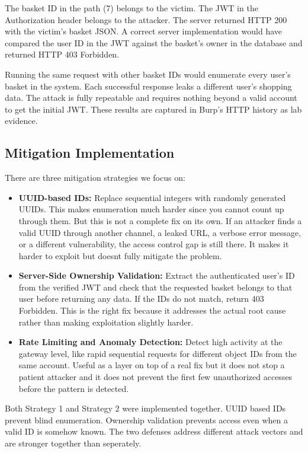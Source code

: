 \documentclass[12pt]{IEEEtran}
\begin{document}
The basket ID in the path (7) belongs to the victim. The JWT in the Authorization header belongs to the attacker. The server returned HTTP 200 with the victim's basket JSON. A correct server implementation would have compared the user ID in the JWT against the basket's owner in the database and returned HTTP 403 Forbidden.

Running the same request with other basket IDs would enumerate every user's basket in the system. Each successful response leaks a different user's shopping data. The attack is fully repeatable and requires nothing beyond a valid account to get the initial JWT. These results are captured in Burp's HTTP history as lab evidence.

\subsection{Mitigation Implementation}

There are three mitigation strategies we focus on:

\begin{itemize}
  \item \textbf{UUID-based IDs:} Replace sequential integers with randomly generated UUIDs. This makes enumeration much harder since you cannot count up through them. But this is not a complete fix on its own. If an attacker finds a valid UUID through another channel, a leaked URL, a verbose error message, or a different vulnerability, the access control gap is still there. It makes it harder to exploit but doesnt fully mitigate the problem.

  \item \textbf{Server-Side Ownership Validation:} Extract the authenticated user's ID from the verified JWT and check that the requested basket belongs to that user before returning any data. If the IDs do not match, return 403 Forbidden. This is the right fix because it addresses the actual root cause rather than making exploitation slightly harder.

  \item \textbf{Rate Limiting and Anomaly Detection:} Detect high activity at the gateway level, like rapid sequential requests for different object IDs from the same account. Useful as a layer on top of a real fix but it does not stop a patient attacker and it does not prevent the first few unauthorized accesses before the pattern is detected.
\end{itemize}

Both Strategy 1 and Strategy 2 were implemented together. UUID based IDs prevent blind enumeration. Ownership validation prevents access even when a valid ID is somehow known. The two defenses address different attack vectors and are stronger together than seperately.
\end{document}
